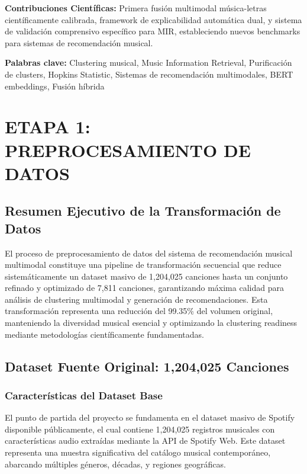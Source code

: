 \documentclass[12pt,a4paper]{report}
\begin{document}
\textbf{Contribuciones Científicas:} Primera fusión multimodal música-letras científicamente calibrada, framework de explicabilidad automática dual, y sistema de validación comprensivo específico para MIR, estableciendo nuevos benchmarks para sistemas de recomendación musical.

\textbf{Palabras clave:} Clustering musical, Music Information Retrieval, Purificación de clusters, Hopkins Statistic, Sistemas de recomendación multimodales, BERT embeddings, Fusión híbrida

\newpage
\tableofcontents

\newpage
\listoftables

\chapter{ETAPA 1: PREPROCESAMIENTO DE DATOS}
\label{chap:preprocesamiento}

\section{Resumen Ejecutivo de la Transformación de Datos}

El proceso de preprocesamiento de datos del sistema de recomendación musical multimodal constituye una pipeline de transformación secuencial que reduce sistemáticamente un dataset masivo de 1,204,025 canciones hasta un conjunto refinado y optimizado de 7,811 canciones, garantizando máxima calidad para análisis de clustering multimodal y generación de recomendaciones. Esta transformación representa una reducción del 99.35\% del volumen original, manteniendo la diversidad musical esencial y optimizando la clustering readiness mediante metodologías científicamente fundamentadas.

\section{Dataset Fuente Original: 1,204,025 Canciones}

\subsection{Características del Dataset Base}

El punto de partida del proyecto se fundamenta en el dataset masivo de Spotify disponible públicamente, el cual contiene 1,204,025 registros musicales con características audio extraídas mediante la API de Spotify Web. Este dataset representa una muestra significativa del catálogo musical contemporáneo, abarcando múltiples géneros, décadas, y regiones geográficas.
\end{document}
